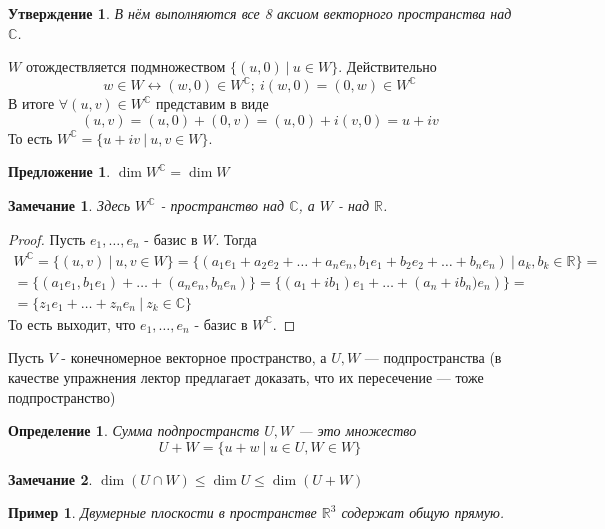 \documentclass[a4paper,12pt]{article}
\newtheorem*{Def}{Определение}
\newtheorem*{Suggestion}{Предложение}
\newtheorem*{Examples}{Пример}
\newtheorem*{Comment}{Замечание}
\newtheorem*{Statement}{Утверждение}
\begin{document}
\begin{Statement}
В нём выполняются все 8 аксиом векторного пространства над $\mathbb{C}$.
\end{Statement}
$W$ отождествляется подмножеством $\{\left(u, 0\right)\ |\ u\in W\}$. Действительно
\[
w\in W\leftrightarrow \left(w,0\right) \in W^\mathbb{C};\ i\left(w,0\right) = \left(0, w\right) \in W^\mathbb{C}
\]
В итоге $\forall \left(u, v\right) \in W^\mathbb{C}$ представим в виде 
\[
\left(u,v\right) = \left(u,0\right) + \left(0,v\right) = \left(u,0\right) + i\left(v,0\right) = u+iv
\]
То есть $W^\mathbb{C} = \{u+iv\ |\ u,v\in W\}$. 
\begin{Suggestion}
$\dim W^\mathbb{C} = \dim W$
\end{Suggestion}
\begin{Comment}
Здесь $W^\mathbb{C}$ - пространство над $\mathbb{C}$, а $W$ - над $\mathbb{R}$.
\end{Comment}
\begin{proof}
Пусть $e_1, \ldots, e_n$ - базис в $W$. Тогда 
\begin{gather*}
W^\mathbb{C} = \{\left(u,v\right)\ |\ u,v \in W\} = \{\left(a_1e_1 + a_2e_2 + \ldots + a_ne_n, b_1e_1 + b_2e_2 + \ldots + b_ne_n\right)\ |\ a_k,b_k \in \mathbb{R}\} = \\
= \{\left(a_1e_1,b_1e_1\right) + \ldots + \left(a_ne_n, b_ne_n\right)\} = \{\left(a_1+ib_1\right)e_1 + \ldots +\left(a_n + ib_n)e_n\right)\} = \\
= \{z_1e_1 + \ldots + z_ne_n\ |\ z_k \in \mathbb{C} \}
\end{gather*}
То есть выходит, что $e_1, \ldots, e_n$ - базис в $W^\mathbb{C}$.
\end{proof}

Пусть $V$ - конечномерное векторное пространство, а $U, W$ --- подпространства (в качестве упражнения лектор предлагает доказать, что их пересечение --- тоже подпространство)

\begin{Def}
Сумма подпространств $U, W$ --- это множество
\[
U+W = \{u + w\ |\ u \in U, W \in W\}
\]
\end{Def}

\begin{Comment}
$\dim \left( U \cap W \right) \leqslant \dim U \leqslant \dim \left(U + W\right)$
\end{Comment}

\begin{Examples}
Двумерные плоскости в пространстве $\mathbb{R}^3$ содержат общую прямую.
\end{Examples}
\end{document}

